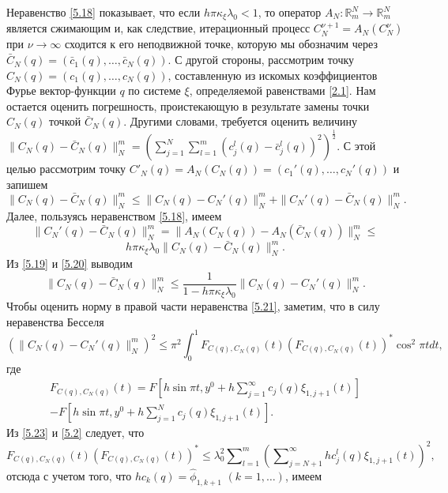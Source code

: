 \documentclass{article}
\numberwithin{equation}{section}
\theoremstyle{plain}
\theoremstyle{definition}
\begin{document}
\begin{fulltext}
Неравенство \eqref{5.18} показывает, что если $h\pi\kappa_\xi\lambda_0<1$, то оператор  $A_N:\mathbb{R}^N_m\to \mathbb{R}^N_m$ является сжимающим и, как следствие, итерационный процесс $C_N^{\nu+1}=A_N(C_N^{\nu})$  при $\nu\to\infty$ сходится к его неподвижной точке, которую мы обозначим через  $\bar C_N(q)=(\bar c_1(q),\ldots,\bar c_{N}(q))$. С другой стороны, рассмотрим точку $C_N(q)=(c_1(q),\ldots,c_{N}(q))$, составленную из искомых коэффициентов Фурье вектор-функции $q$ по системе $\xi$, определяемой равенствами \eqref{2.1}. Нам остается оценить погрешность, проистекающую в результате замены точки $C_N(q)$ точкой $\bar C_N(q)$. Другими словами, требуется оценить величину
$\|C_N(q)-\bar C_N(q)\|_N^m= \left(\sum_{j=1}^{N}\sum\nolimits_{l=1}^m(c_j^l(q)-\bar c_j^l(q))^2\right)^\frac12$. С этой целью рассмотрим точку $C'_N(q)=A_N(C_N(q))=(c_1'(q),\ldots,c_{N}'(q))$ и запишем
\begin{equation}\label{5.19}
\|C_N(q)-\bar C_N(q)\|_N^m\le \|C_N(q)- C_N'(q)\|_N^m+\|C_N'(q)-\bar C_N(q)\|_N^m.
\end{equation}
Далее, пользуясь неравенством \eqref{5.18}, имеем
$$
\|C_N'(q)-\bar C_N(q)\|_N^m=\|A_N(C_N(q))-A_N(\bar C_N(q))\|_N^m\le
$$
\begin{equation}\label{5.20}
h\pi\kappa_\xi\lambda_0\|C_N(q)-\bar C_N(q)\|_N^m.
\end{equation}
Из \eqref{5.19} и \eqref{5.20} выводим
\begin{equation}\label{5.21}
\|C_N(q)-\bar C_N(q)\|_N^m\le \frac1{1-h\pi\kappa_\xi\lambda_0}\|C_N(q)- C_N'(q)\|_N^m.
\end{equation}
Чтобы оценить норму в правой части неравенства \eqref{5.21}, заметим, что в силу неравенства Бесселя
\begin{equation}\label{5.22}
(\|C_N(q)- C_N'(q)\|_N^m)^2\le \pi^2\int_{0}^1 F_{C(q),C_N(q)}(t)( F_{C(q),C_N(q)}(t))^*\cos^2\pi t dt,
\end{equation}
где
\begin{multline}\label{5.23}
  F_{C(q),C_N(q)}(t)= F\left[h\sin\pi t,y^0+ h\sum\nolimits_{j=1}^\infty c_j(q)\xi_{1,j+1}(t)\right] \\
  - F\left[h\sin\pi t,y^0+ h\sum\nolimits_{j=1}^{N}c_j(q)\xi_{1,j+1}(t)\right].
\end{multline}
Из \eqref{5.23} и \eqref{5.2} следует, что
$$
F_{C(q),C_N(q)}(t)(F_{C(q),C_N(q)}(t))^*\le \lambda_0^2 \sum\nolimits_{l=1}^m  \left(\sum\nolimits_{j=N+1}^\infty hc_j^l(q)\xi_{1,j+1}(t)\right)^2,
$$
отсюда с учетом того, что $hc_k(q)=\hat \phi_{1,k+1}$ $(k=1,\ldots)$, имеем
\begin{equation}\label{5.24}

\end{equation}
\end{fulltext}
\end{document}
